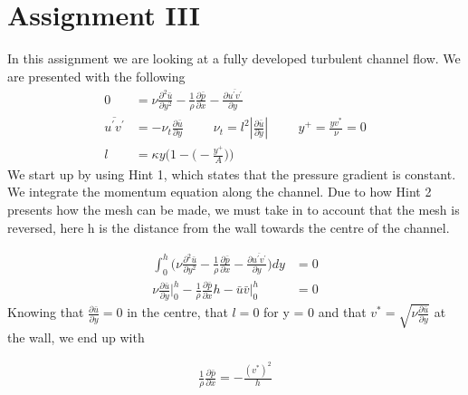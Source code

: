 \documentclass[a4paper,norsk]{article}
\begin{document}
\newpage
\section*{Assignment III}
In this assignment we are looking at a fully developed turbulent channel flow. We are presented with the following
\begin{align*}
0 &= \nu \frac{\partial^2 \bar{u}}{\partial y^2} - \frac{1}{\rho} \frac{\partial \bar{p}}{\partial x} -
\frac{\partial \overline{u^\prime v^\prime}}{\partial y} \\
\overline{u^\prime v^\prime} &= -\nu_t \frac{\partial \bar{u}}{\partial y} \hspace{1cm} \nu_t = l^2
|\frac{\partial \bar{u}}{\partial y}| \hspace{1cm} y^+ = \frac{yv^*}{\nu} = 0 \\
l &= \kappa y \Big(1- \Big(-\frac{y^+}{A} \Big) \Big)
\end{align*}
We start up by using Hint 1, which states that the pressure gradient is constant. We integrate the momentum equation
along the channel. Due to how Hint 2 presents how the mesh can be made, we must take in to account that the mesh is 
reversed, here h is the distance from the wall towards the centre of the channel.

\begin{align*}
\int_0^h \Big(\nu \frac{\partial^2 \bar{u}}{\partial y^2} - \frac{1}{\rho} \frac{\partial \bar{p}}{\partial x} -
\frac{\partial \overline{u^\prime v^\prime}}{\partial y} \Big) dy &=  0\\
\nu \frac{\partial \bar{u}}{\partial y} \Big|^h_0 - \frac{1}{\rho} \frac{\partial \bar{p}}{\partial x}h -
\bar{u}\bar{v}\Big|^h_0 &= 0
\end{align*}
Knowing that $\frac{\partial \bar{u}}{\partial y} = 0$ in the centre, that $l = 0$ for y = 0 and
that $v^* = \sqrt{\nu \frac{\partial \bar{u}}{\partial y}}$ at the wall, we end up with

\begin{align*}
\frac{1}{\rho} \frac{\partial \bar{p}}{\partial x} = - \frac{(v^*)^2}{h}
\end{align*}
\end{document}
